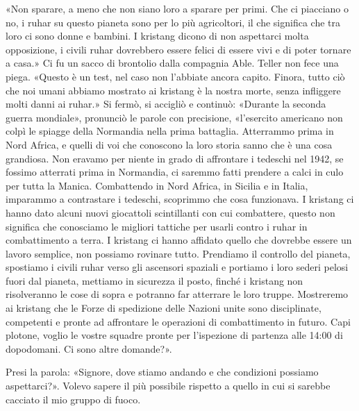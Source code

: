 «Non sparare, a meno che non siano loro a sparare per primi. Che ci
piacciano o no, i ruhar su questo pianeta sono per lo più agricoltori,
il che significa che tra loro ci sono donne e bambini. I kristang dicono
di non aspettarci molta opposizione, i civili ruhar dovrebbero essere
felici di essere vivi e di poter tornare a casa.» Ci fu un sacco di
brontolio dalla compagnia Able. Teller non fece una piega. «Questo è un
test, nel caso non l'abbiate ancora capito. Finora, tutto ciò che noi
umani abbiamo mostrato ai kristang è la nostra morte, senza infliggere
molti danni ai ruhar.» Si fermò, si accigliò e continuò: «Durante la
seconda guerra mondiale», pronunciò le parole con precisione,
«l'esercito americano non colpì le spiagge della Normandia nella prima
battaglia. Atterrammo prima in Nord Africa, e quelli di voi che
conoscono la loro storia sanno che è una cosa grandiosa. Non eravamo per
niente in grado di affrontare i tedeschi nel 1942, se fossimo atterrati
prima in Normandia, ci saremmo fatti prendere a calci in culo per tutta
la Manica. Combattendo in Nord Africa, in Sicilia e in Italia, imparammo
a contrastare i tedeschi, scoprimmo che cosa funzionava. I kristang ci
hanno dato alcuni nuovi giocattoli scintillanti con cui combattere,
questo non significa che conosciamo le migliori tattiche per usarli
contro i ruhar in combattimento a terra. I kristang ci hanno affidato
quello che dovrebbe essere un lavoro semplice, non possiamo rovinare
tutto. Prendiamo il controllo del pianeta, spostiamo i civili ruhar
verso gli ascensori spaziali e portiamo i loro sederi pelosi fuori dal
pianeta, mettiamo in sicurezza il posto, finché i kristang non
risolveranno le cose di sopra e potranno far atterrare le loro truppe.
Mostreremo ai kristang che le Forze di spedizione delle Nazioni unite
sono disciplinate, competenti e pronte ad affrontare le operazioni di
combattimento in futuro. Capi plotone, voglio le vostre squadre pronte
per l'ispezione di partenza alle 14:00 di dopodomani. Ci sono altre
domande?».

Presi la parola: «Signore, dove stiamo andando e che condizioni possiamo
aspettarci?». Volevo sapere il più possibile rispetto a quello in cui si
sarebbe cacciato il mio gruppo di fuoco.

